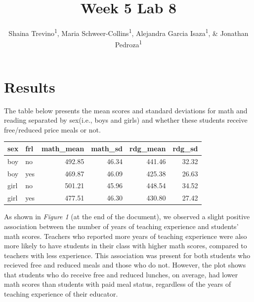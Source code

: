 \documentclass[man]{apa6}
\title{Week 5 Lab 8}
\author{Shaina Trevino\textsuperscript{1}, Maria
Schweer-Collins\textsuperscript{1}, Alejandra Garcia
Isaza\textsuperscript{1}, \& Jonathan Pedroza\textsuperscript{1}}
\date{}
\affiliation{
\vspace{0.5cm}
\textsuperscript{1} University of Oregon}
\begin{document}
\maketitle

\section{Results}\label{results}

The table below presents the mean scores and standard deviations for
math and reading separated by sex(i.e., boys and girls) and whether
these students receive free/reduced price meals or not.

\begin{tabular}{l|l|r|r|r|r}
\hline
sex & frl & math\_mean & math\_sd & rdg\_mean & rdg\_sd\\
\hline
boy & no & 492.85 & 46.34 & 441.46 & 32.32\\
\hline
boy & yes & 469.87 & 46.09 & 425.38 & 26.63\\
\hline
girl & no & 501.21 & 45.96 & 448.54 & 34.52\\
\hline
girl & yes & 477.51 & 46.30 & 430.80 & 27.42\\
\hline
\end{tabular}

As shown in \emph{Figure 1} (at the end of the document), we observed a
slight positive association between the number of years of teaching
experience and students' math scores. Teachers who reported more years
of teaching experience were also more likely to have students in their
class with higher math scores, compared to teachers with less
experience. This association was present for both students who recieved
free and reduced meals and those who do not. However, the plot shows
that students who do receive free and reduced lunches, on average, had
lower math scores than students with paid meal status, regardless of the
years of teaching experience of their educator.
\end{document}
